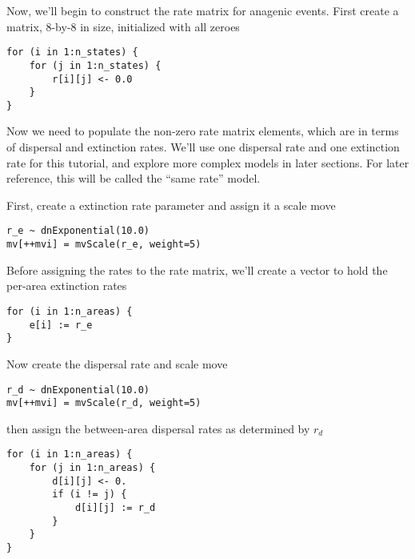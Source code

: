 Now, we'll begin to construct the rate matrix for anagenic events. First create a matrix, 8-by-8 in size, initialized with all zeroes

\begin{snugshade}
\begin{lstlisting}
for (i in 1:n_states) {
    for (j in 1:n_states) {
        r[i][j] <- 0.0
    }
}
\end{lstlisting}
\end{snugshade}

Now we need to populate the non-zero rate matrix elements, which are in terms of dispersal and extinction rates.
We'll use one dispersal rate and one extinction rate for this tutorial, and explore more complex models in later sections.
For later reference, this will be called the ``same rate'' model.

First, create a extinction rate parameter and assign it a scale move

\begin{snugshade}
\begin{lstlisting}
r_e ~ dnExponential(10.0)
mv[++mvi] = mvScale(r_e, weight=5)
\end{lstlisting}
\end{snugshade}

Before assigning the rates to the rate matrix, we'll create a vector to hold the per-area extinction rates 

\begin{snugshade}
\begin{lstlisting}
for (i in 1:n_areas) {
    e[i] := r_e
}
\end{lstlisting}
\end{snugshade}

Now create the dispersal rate and scale move

\begin{snugshade}
\begin{lstlisting}
r_d ~ dnExponential(10.0)
mv[++mvi] = mvScale(r_d, weight=5)
\end{lstlisting}
\end{snugshade}

then assign the between-area dispersal rates as determined by {\tt $r_d$}

\begin{snugshade}
\begin{lstlisting}
for (i in 1:n_areas) {
    for (j in 1:n_areas) {
    	d[i][j] <- 0.
        if (i != j) {
            d[i][j] := r_d
        }
    }
}
\end{lstlisting}
\end{snugshade}

